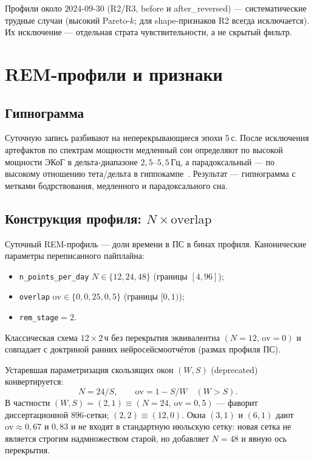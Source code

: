 \documentclass{article}
\begin{document}
Профили около $2024$-$09$-$30$ (R2/R3, before и after\_reversed) ---
систематические трудные случаи (высокий Pareto-$k$; для shape-признаков
R2 всегда исключается). Их исключение --- отдельная страта
чувствительности, а не скрытый фильтр.

\section{REM-профили и признаки}

\subsection{Гипнограмма}

Суточную запись разбивают на неперекрывающиеся эпохи $5$\,с. После
исключения артефактов по спектрам мощности медленный сон определяют по
высокой мощности ЭКоГ в дельта-диапазоне $2{,}5$--$5{,}5$\,Гц, а
парадоксальный --- по высокому отношению тета/дельта в
гиппокампе~\cite{Fang2010,Vyazovskiy2005,Saevskiy2025}. Результат ---
гипнограмма с метками бодрствования, медленного и парадоксального сна.

\subsection{Конструкция профиля: $N\times\mathrm{overlap}$}

Суточный REM-профиль --- доли времени в ПС в бинах профиля. Канонические
параметры переписанного пайплайна:
\begin{itemize}[leftmargin=1.4em,itemsep=0.2em,topsep=0.3em]
  \item \texttt{n\_points\_per\_day} $N\in\{12,24,48\}$ (границы $[4,96]$);
  \item \texttt{overlap} $\mathrm{ov}\in\{0,0{,}25,0{,}5\}$ (границы $[0,1)$);
  \item \texttt{rem\_stage}${}=2$.
\end{itemize}
Классическая схема $12\times 2$\,ч без перекрытия эквивалентна
$(N{=}12,\,\mathrm{ov}{=}0)$ и совпадает с доктриной ранних
нейросейсмоотчётов (размах профиля ПС).

Устаревшая параметризация скользящих окон $(W,S)$ (deprecated)
конвертируется:
\[
N=24/S,\qquad
\mathrm{ov}=1-S/W\quad (W>S).
\]
В частности $(W,S)=(2,1)\equiv(N{=}24,\,\mathrm{ov}{=}0{,}5)$ ---
фаворит диссертационной $896$-сетки; $(2,2)\equiv(12,0)$. Окна
$(3,1)$ и $(6,1)$ дают $\mathrm{ov}\approx0{,}67$ и $0{,}83$ и
\emph{не} входят в стандартную июльскую сетку: новая сетка не является
строгим надмножеством старой, но добавляет $N{=}48$ и явную ось
перекрытия.
\end{document}
